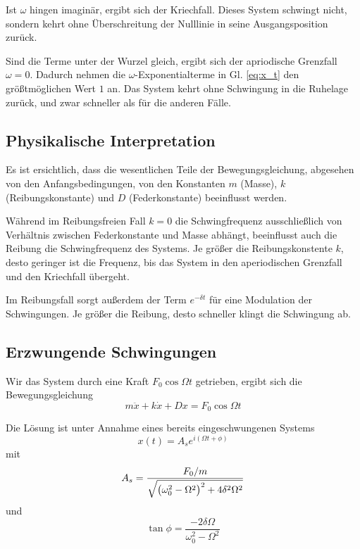 \documentclass[a4paper,german,12pt,smallheadings]{scrartcl}
\begin{document}
Ist $\omega$ hingen imaginär, ergibt sich der Kriechfall. Dieses System
schwingt nicht, sondern kehrt ohne Überschreitung der Nulllinie in seine
Ausgangsposition zurück.

Sind die Terme unter der Wurzel gleich, ergibt sich der apriodische Grenzfall
$\omega = 0$. Dadurch nehmen die $\omega$-Exponentialterme in Gl. \ref{eq:x_t}
den größtmöglichen Wert $1$ an. Das System kehrt ohne Schwingung in die
Ruhelage zurück, und zwar schneller als für die anderen Fälle.

\subsection{Physikalische Interpretation}
Es ist ersichtlich, dass die wesentlichen Teile der Bewegungsgleichung,
abgesehen von den Anfangsbedingungen, von den Konstanten $m$ (Masse), $k$
(Reibungskonstante) und $D$ (Federkonstante) beeinflusst werden.

Während im Reibungsfreien Fall $k=0$ die Schwingfrequenz ausschließlich von
Verhältnis zwischen Federkonstante und Masse abhängt, beeinflusst auch die
Reibung die Schwingfrequenz des Systems. Je größer die Reibungskonstente $k$,
desto geringer ist die Frequenz, bis das System in den aperiodischen Grenzfall
und den Kriechfall übergeht.

Im Reibungsfall sorgt außerdem der Term $e^{- \delta t}$ für eine Modulation
der Schwingungen. Je größer die Reibung, desto schneller klingt die Schwingung
ab.

\subsection{Erzwungende Schwingungen}
Wir das System durch eine Kraft $F_0 \cos \Omega t$ getrieben, ergibt sich die
Bewegungsgleichung
\begin{equation}
  m \ddot{x} + k \dot{x} + D x = F_0 \cos \Omega t
\end{equation}

Die Lösung ist unter Annahme eines bereits eingeschwungenen Systems
\begin{equation}
  x(t) = A_s e^{i (\Omega t + \phi)}
\end{equation}
mit
\begin{equation}
  A_s = \frac{F_0 / m}{\sqrt{\del{\omega_0^2 - \Omega^2}^2 + 4 \delta^2 \Omega^2}}
  \label{eq:amp}
\end{equation}
und
\begin{equation}
  \tan \phi = \frac{- 2 \delta \Omega}{\omega_0^2 - \Omega^2}
  \label{eq:tan}
\end{equation}
\end{document}
